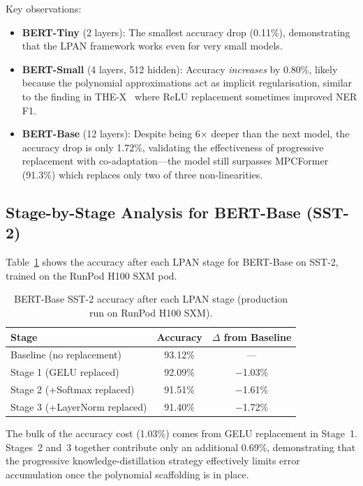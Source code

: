 Key observations:
\begin{itemize}
    \item \textbf{BERT-Tiny} (2 layers): The smallest accuracy drop (0.11\%), demonstrating that the LPAN framework works even for very small models.
    \item \textbf{BERT-Small} (4 layers, 512 hidden): Accuracy \emph{increases} by 0.80\%, likely because the polynomial approximations act as implicit regularisation, similar to the finding in THE-X~\cite{chen2022thex} where ReLU replacement sometimes improved NER F1.
    \item \textbf{BERT-Base} (12 layers): Despite being 6$\times$ deeper than the next model, the accuracy drop is only 1.72\%, validating the effectiveness of progressive replacement with co-adaptation---the model still surpasses MPCFormer (91.3\%) which replaces only two of three non-linearities.
\end{itemize}

\subsection{Stage-by-Stage Analysis for BERT-Base (SST-2)}

Table~\ref{tab:bert_base_stages} shows the accuracy after each LPAN stage for BERT-Base on SST-2, trained on the RunPod H100 SXM pod.

\begin{table}[ht]
\centering
\caption{BERT-Base SST-2 accuracy after each LPAN stage (production run on RunPod H100 SXM).}
\label{tab:bert_base_stages}
\begin{tabular}{lcc}
\toprule
\textbf{Stage} & \textbf{Accuracy} & \textbf{$\Delta$ from Baseline} \\
\midrule
Baseline (no replacement)          & 93.12\% & --- \\
Stage 1 (GELU replaced)           & 92.09\% & $-$1.03\% \\
Stage 2 ({+}Softmax replaced)      & 91.51\% & $-$1.61\% \\
Stage 3 ({+}LayerNorm replaced)    & 91.40\% & $-$1.72\% \\
\bottomrule
\end{tabular}
\end{table}

The bulk of the accuracy cost (1.03\%) comes from GELU replacement in Stage~1. Stages~2 and~3 together contribute only an additional 0.69\%, demonstrating that the progressive knowledge-distillation strategy effectively limits error accumulation once the polynomial scaffolding is in place.

